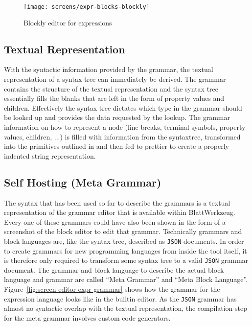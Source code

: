 \documentclass[sigconf,natbib=false,review=true,anonymous]{acmart}
\begin{document}
\begin{figure}
  \texttt{[image: screens/expr-blocks-blockly]}
  \caption{Blockly editor for expressions}
  \label{fig:screen-editor-expr-blockly}
\end{figure}

\subsection{Textual Representation}

With the syntactic information provided by the grammar, the textual representation of a syntax tree can immediately be derived. The grammar contains the structure of the textual representation and the syntax tree essentially fills the blanks that are left in the form of property values and children. Effectively the syntax tree dictates which type in the grammar should be looked up and provides the data requested by the lookup. The grammar information on how to represent a node (line breaks, terminal symbols, property values, children, ...) is filled with information from the syntaxtree, transformed into the primitives outlined in \cite{wadler_prettier_printer} and then fed to prettier to create a properly indented string representation.

\subsection{Self Hosting (Meta Grammar)}

The syntax that has been used so far to describe the grammars is a textual representation of the grammar editor that is available within Blatt\-Werkzeug. Every one of these grammars could have also been shown in the form of a screenshot of the block editor to edit that grammar. Technically grammars and block languages are, like the syntax tree, described as \texttt{JSON}-documents. In order to create grammars for new programming languages from inside the tool itself, it is therefore only required to transform some syntax tree to a valid \texttt{JSON} grammar document. The grammar and block language to describe the actual block language and grammar are called \enquote{Meta Grammar} and \enquote{Meta Block Language}. Figure~\ref{fig:screen-editor-expr-grammar} shows how the grammar for the expression language looks like in the builtin editor. As the \texttt{JSON} grammar has almost no syntactic overlap with the textual representation, the compilation step for the meta grammar involves custom code generators.
\end{document}
